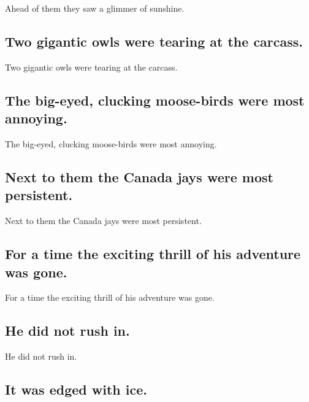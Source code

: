 \documentclass[]{article}
\begin{document}
Ahead of them they saw a glimmer of sunshine.

\hypertarget{two-gigantic-owls-were-tearing-at-the-carcass.}{%
\subsection{Two gigantic owls were tearing at the
carcass.}\label{two-gigantic-owls-were-tearing-at-the-carcass.}}

Two gigantic owls were tearing at the carcass.

\hypertarget{the-big-eyed-clucking-moose-birds-were-most-annoying.}{%
\subsection{The big-eyed, clucking moose-birds were most
annoying.}\label{the-big-eyed-clucking-moose-birds-were-most-annoying.}}

The big-eyed, clucking moose-birds were most annoying.

\hypertarget{next-to-them-the-canada-jays-were-most-persistent.}{%
\subsection{Next to them the Canada jays were most
persistent.}\label{next-to-them-the-canada-jays-were-most-persistent.}}

Next to them the Canada jays were most persistent.

\hypertarget{for-a-time-the-exciting-thrill-of-his-adventure-was-gone.}{%
\subsection{For a time the exciting thrill of his adventure was
gone.}\label{for-a-time-the-exciting-thrill-of-his-adventure-was-gone.}}

For a time the exciting thrill of his adventure was gone.

\hypertarget{he-did-not-rush-in.}{%
\subsection{He did not rush in.}\label{he-did-not-rush-in.}}

He did not rush in.

\hypertarget{it-was-edged-with-ice.}{%
\subsection{It was edged with ice.}\label{it-was-edged-with-ice.}}
\end{document}
